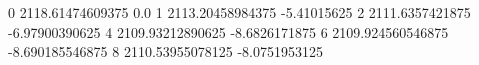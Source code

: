 0 2118.61474609375 0.0
1 2113.20458984375 -5.41015625
2 2111.6357421875 -6.97900390625
4 2109.93212890625 -8.6826171875
6 2109.924560546875 -8.690185546875
8 2110.53955078125 -8.0751953125
